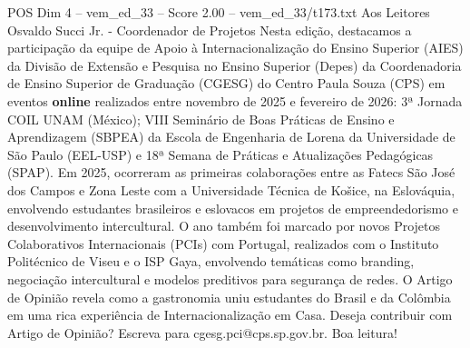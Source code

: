\begin{textsample}{POS Dim 4 – vem\_ed\_33 – Score 2.00 – vem\_ed\_33/t173.txt}  \label{ex:f4_pos_130}
Aos Leitores Osvaldo Succi Jr. - Coordenador de Projetos Nesta edição, destacamos a participação da equipe de Apoio à Internacionalização do Ensino Superior (AIES) da Divisão de Extensão e Pesquisa no Ensino Superior (Depes) da Coordenadoria de Ensino Superior de Graduação (CGESG) do Centro Paula Souza (CPS) em eventos \textbf{online} realizados entre novembro de 2025 e fevereiro de 2026: 3ª Jornada COIL UNAM (México); VIII Seminário de Boas Práticas de Ensino e Aprendizagem (SBPEA) da Escola de Engenharia de Lorena da Universidade de São Paulo (EEL-USP) e 18ª Semana de Práticas e Atualizações Pedagógicas (SPAP).
Em 2025, ocorreram as primeiras colaborações entre as Fatecs São José dos Campos e Zona Leste com a Universidade Técnica de Košice, na Eslováquia, envolvendo estudantes brasileiros e eslovacos em projetos de empreendedorismo e desenvolvimento intercultural.
O ano também foi marcado por novos Projetos Colaborativos Internacionais (PCIs) com Portugal, realizados com o Instituto Politécnico de Viseu e o ISP Gaya, envolvendo temáticas como branding, negociação intercultural e modelos preditivos para segurança de redes.
O Artigo de Opinião revela como a gastronomia uniu estudantes do Brasil e da Colômbia em uma rica experiência de Internacionalização em Casa.
Deseja contribuir com Artigo de Opinião?
Escreva para cgesg.pci@cps.sp.gov.br.
Boa leitura!

\end{textsample}
